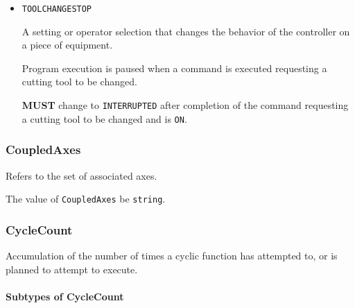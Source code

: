 \begin{itemize}
\item \texttt{TOOL\textunderscore CHANGE\textunderscore STOP}


A setting or operator selection that changes the behavior of the controller on a piece of equipment.  

Program execution is paused when a command is executed requesting a cutting tool to be changed. 

 \textbf{MUST} change to \texttt{INTERRUPTED} after completion of the command requesting a cutting tool to be changed and  is \texttt{ON}.


\end{itemize}








\subsubsection{CoupledAxes}
\label{sec:CoupledAxes}



Refers to the set of associated axes.


The value of \texttt{CoupledAxes} \MUST be \texttt{string}.



\subsubsection{CycleCount}
\label{sec:CycleCount}



Accumulation of the number of times a cyclic function has attempted to, or is planned to attempt to execute.


\paragraph{Subtypes of CycleCount}\mbox{}
\label{sec:Subtypes of CycleCount}

